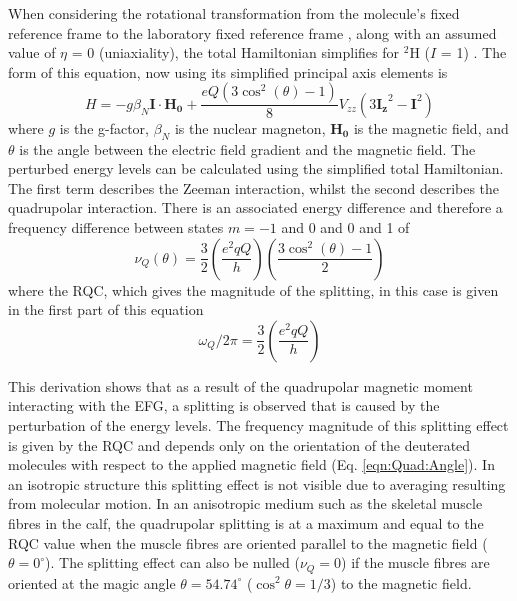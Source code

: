 When considering the rotational transformation from the molecule's fixed reference frame to the laboratory fixed reference frame \cite{Seelig1977DeuteriumMembranes}, along with an assumed value of $\eta$ = 0 (uniaxiality), the total Hamiltonian simplifies for $^2$H ($I$ = 1)  \cite{Sharf1995DetectionNMR-Spectroscopy}. The form of this equation, now using its simplified principal axis elements is
\begin{equation}
    H = -g\beta_N\boldsymbol{I}\cdot\boldsymbol{H_0} + \frac{eQ(3\cos^2(\theta)-1)}{8}V_{zz}(3\boldsymbol{I_z}^2-\boldsymbol{I}^2)
\end{equation}
where $g$ is the g-factor, $\beta_N$ is the nuclear magneton, $\boldsymbol{H_0}$ is the magnetic field,  and $\theta$ is the angle between the electric field gradient and the magnetic field. The perturbed energy levels can be calculated using the simplified total Hamiltonian. The first term describes the Zeeman interaction, whilst the second describes the quadrupolar interaction. There is an associated energy difference and therefore a frequency difference between states $m=-1$ and 0 and 0 and 1 of 
\begin{equation}
    \nu_Q(\theta) = \frac{3}{2}\left(\frac{e^2qQ}{h}\right)\left(\frac{3\cos^2(\theta)-1}{2}\right)
    \label{eqn:Quad:Angle}
\end{equation}
where the \ac{RQC}, which gives the magnitude of the splitting, in this case is given in the first part of this equation
\begin{equation}
    \omega_Q/2\pi = \frac{3}{2}\left(\frac{e^2qQ}{h}\right)
    \label{eqn:Quad:RQC}
\end{equation}

This derivation shows that as a result of the quadrupolar magnetic moment interacting with the \ac{EFG}, a splitting is observed that is caused by the perturbation of the energy levels. The frequency magnitude of this splitting effect is given by the \ac{RQC} and depends only on the orientation of the deuterated  molecules with respect to the applied magnetic field (Eq. \ref{eqn:Quad:Angle}). In an isotropic structure this splitting effect is not visible due to averaging resulting from molecular motion. In an anisotropic medium such as the skeletal muscle fibres in the calf, the quadrupolar splitting is at a maximum and equal to the \ac{RQC} value when the muscle fibres are oriented parallel to the magnetic field ($\theta = 0^\circ$). The splitting effect can also be nulled ($\nu_Q = 0$) if the muscle fibres are oriented at the magic angle $\theta = 54.74^\circ$ ($\cos^2\theta=1/3$) to the magnetic field.


